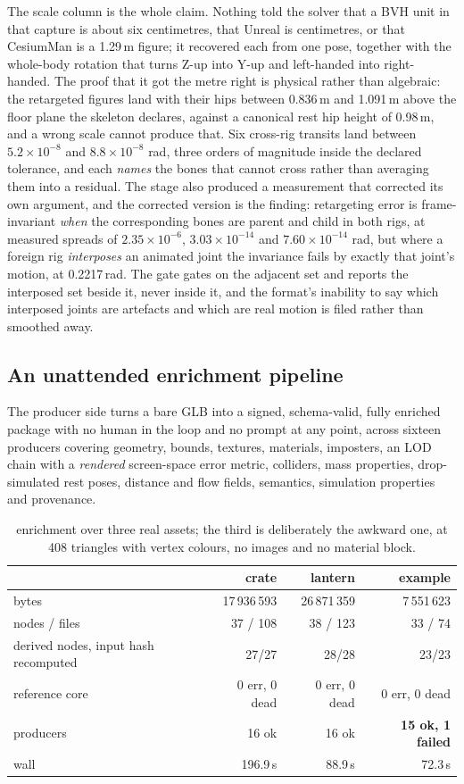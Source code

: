 \documentclass[10pt,twocolumn,letterpaper]{article}
\begin{document}
The scale column is the whole claim. Nothing told the solver that a BVH unit in that capture is about six centimetres, that Unreal is centimetres, or that CesiumMan is a 1.29\,m figure; it recovered each from one pose, together with the whole-body rotation that turns Z-up into Y-up and left-handed into right-handed. The proof that it got the metre right is physical rather than algebraic: the retargeted figures land with their hips between 0.836\,m and 1.091\,m above the floor plane the skeleton declares, against a canonical rest hip height of 0.98\,m, and a wrong scale cannot produce that. Six cross-rig transits land between $5.2\times10^{-8}$ and $8.8\times10^{-8}$ rad, three orders of magnitude inside the declared tolerance, and each \emph{names} the bones that cannot cross rather than averaging them into a residual. The stage also produced a measurement that corrected its own argument, and the corrected version is the finding: retargeting error is frame-invariant \emph{when} the corresponding bones are parent and child in both rigs, at measured spreads of $2.35\times10^{-6}$, $3.03\times10^{-14}$ and $7.60\times10^{-14}$ rad, but where a foreign rig \emph{interposes} an animated joint the invariance fails by exactly that joint's motion, at 0.2217\,rad. The gate gates on the adjacent set and reports the interposed set beside it, never inside it, and the format's inability to say which interposed joints are artefacts and which are real motion is filed rather than smoothed away.

\subsection{An unattended enrichment pipeline}

The producer side turns a bare GLB into a signed, schema-valid, fully enriched package with no human in the loop and no prompt at any point, across sixteen producers covering geometry, bounds, textures, materials, imposters, an LOD chain with a \emph{rendered} screen-space error metric, colliders, mass properties, drop-simulated rest poses, distance and flow fields, semantics, simulation properties and provenance.

\begin{table}[t]\centering\footnotesize
\caption{enrichment over three real assets; the third is deliberately the awkward one, at 408 triangles with vertex colours, no images and no material block.}
\begin{tabular}{@{}L{2.9cm} r r r@{}}
\toprule
 & crate & lantern & example \\
\midrule
bytes & 17\,936\,593 & 26\,871\,359 & 7\,551\,623 \\
nodes / files & 37 / 108 & 38 / 123 & 33 / 74 \\
derived nodes, input hash recomputed & 27/27 & 28/28 & 23/23 \\
reference core & 0 err, 0 dead & 0 err, 0 dead & 0 err, 0 dead \\
producers & 16 ok & 16 ok & \textbf{15 ok, 1 failed} \\
wall & 196.9\,s & 88.9\,s & 72.3\,s \\
\bottomrule
\end{tabular}
\end{table}
\end{document}
